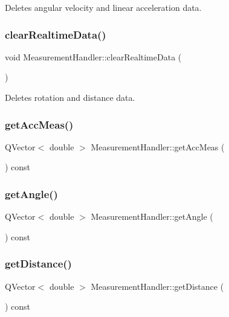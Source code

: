 Deletes angular velocity and linear acceleration data. 

\mbox{\label{class_measurement_handler_a97180ca03e2cbf6735eae197493cb7e9}} 
\subsubsection{clear\+Realtime\+Data()}
{\footnotesize\ttfamily void Measurement\+Handler\+::clear\+Realtime\+Data (\begin{DoxyParamCaption}{ }\end{DoxyParamCaption})}



Deletes rotation and distance data. 

\mbox{\label{class_measurement_handler_a16cda730675bd1c0523327c6fd6a1669}} 
\subsubsection{get\+Acc\+Meas()}
{\footnotesize\ttfamily Q\+Vector$<$ double $>$ Measurement\+Handler\+::get\+Acc\+Meas (\begin{DoxyParamCaption}{ }\end{DoxyParamCaption}) const}

\mbox{\label{class_measurement_handler_a95251b5abed0a716be546e4c58f48910}} 
\subsubsection{get\+Angle()}
{\footnotesize\ttfamily Q\+Vector$<$ double $>$ Measurement\+Handler\+::get\+Angle (\begin{DoxyParamCaption}{ }\end{DoxyParamCaption}) const}

\mbox{\label{class_measurement_handler_a4d4422673f5deb300499051df34dec30}} 
\subsubsection{get\+Distance()}
{\footnotesize\ttfamily Q\+Vector$<$ double $>$ Measurement\+Handler\+::get\+Distance (\begin{DoxyParamCaption}{ }\end{DoxyParamCaption}) const}

